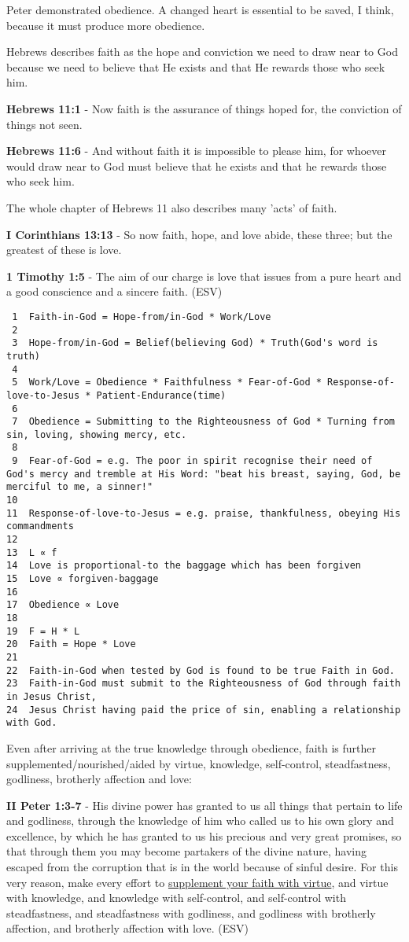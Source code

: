 \documentclass[11pt]{article}
\begin{document}
Peter demonstrated obedience. A changed heart is essential to be saved, I think, because it must produce more obedience.

Hebrews describes faith as the hope and conviction we need to draw near to God because we need to believe that He exists and that He rewards those who seek him.

\textbf{Hebrews 11:1} - Now faith is the assurance of things hoped for, the conviction of things not seen.

\textbf{Hebrews 11:6} - And without faith it is impossible to please him, for whoever would draw near to God must believe that he exists and that he rewards those who seek him.

The whole chapter of Hebrews 11 also describes many 'acts' of faith.

\textbf{I Corinthians 13:13} - So now faith, hope, and love abide, these three; but the greatest of these is love.

\textbf{1 Timothy 1:5} -  The aim of our charge is love that issues from a pure heart and a good conscience and a sincere faith.  (ESV)

\begin{verbatim}
 1  Faith-in-God = Hope-from/in-God * Work/Love
 2  
 3  Hope-from/in-God = Belief(believing God) * Truth(God's word is truth)
 4  
 5  Work/Love = Obedience * Faithfulness * Fear-of-God * Response-of-love-to-Jesus * Patient-Endurance(time)
 6  
 7  Obedience = Submitting to the Righteousness of God * Turning from sin, loving, showing mercy, etc.
 8  
 9  Fear-of-God = e.g. The poor in spirit recognise their need of God's mercy and tremble at His Word: "beat his breast, saying, God, be merciful to me, a sinner!"
10  
11  Response-of-love-to-Jesus = e.g. praise, thankfulness, obeying His commandments
12  
13  L ∝ f
14  Love is proportional-to the baggage which has been forgiven
15  Love ∝ forgiven-baggage
16  
17  Obedience ∝ Love
18  
19  F = H * L
20  Faith = Hope * Love
21  
22  Faith-in-God when tested by God is found to be true Faith in God.
23  Faith-in-God must submit to the Righteousness of God through faith in Jesus Christ,
24  Jesus Christ having paid the price of sin, enabling a relationship with God.
\end{verbatim}

Even after arriving at the true knowledge through obedience, faith is further supplemented/nourished/aided by virtue, knowledge, self-control, steadfastness, godliness, brotherly affection and love:

\textbf{II Peter 1:3-7} - His divine power has granted to us all things that pertain to life and godliness, through the knowledge of him who called us to his own glory and excellence, by which he has granted to us his precious and very great promises, so that through them you may become partakers of the divine nature, having escaped from the corruption that is in the world because of sinful desire. For this very reason, make every effort to \uline{supplement your faith with virtue}, and virtue with knowledge, and knowledge with self-control, and self-control with steadfastness, and steadfastness with godliness, and godliness with brotherly affection, and brotherly affection with love. (ESV)
\end{document}
